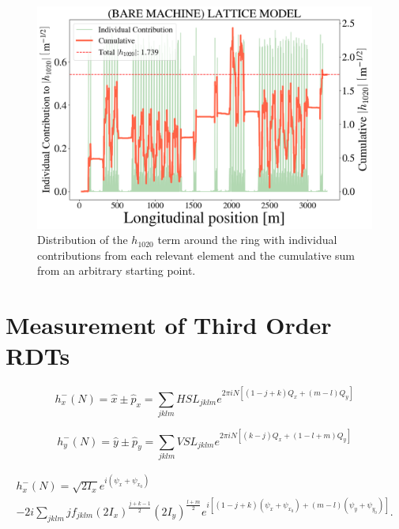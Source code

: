 \begin{figure}[H]
    \centering
    \includegraphics[width=\columnwidth]{chapter4/h1020_bare.png}
    \caption{Distribution of the $h_{1020}$ term around the ring with individual contributions from each relevant element and the cumulative sum from an arbitrary starting point.}
    \label{fig:h1020bare}
\end{figure}

\section{Measurement of Third Order RDTs}

\begin{equation}
    \label{eq:hxspect}
    h_x^{-}(N)= \hat{x} \pm \hat{p}_x = \sum_{jklm}HSL_{jklm}e^{2\pi i N \left[ \left( 1-j+k\right)Q_x+\left( m-l \right)Q_y\right]}
\end{equation}

\begin{equation}
    \label{eq:hyspect}
    h_y^{-}(N)= \hat{y} \pm \hat{p}_y = \sum_{jklm}VSL_{jklm}e^{2\pi i N \left[ \left( k-j\right)Q_x+\left(1-l+m \right)Q_y\right]}
\end{equation}

\begin{multline}
    \label{eq:hxpsi2}
    h_x^{-}(N)=\sqrt{2I_x}e^{i\left( \psi_x+\psi_{x_0}\right)} \\
    -2i \sum_{jklm} j f_{jklm} \left( 2I_x \right)^{\frac{j+k-1}{2}}\left( 2I_y \right)^{\frac{l+m}{2}}
    e^{i \left[ \left( 1-j+k\right)\left( \psi_x + \psi_{x_0} \right) +\left( m-l\right)\left( \psi_y + \psi_{y_0} \right)\right]}.
\end{multline}

